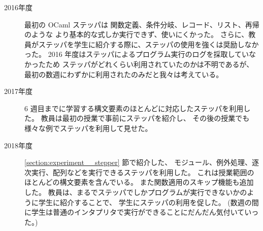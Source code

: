\begin{description}
\item[2016年度] 最初の OCaml ステッパは
関数定義、条件分岐、レコード、リスト、再帰のような
より基本的な式しか実行できず、使いにくかった。
さらに、教員がステッパを学生に紹介する際に、ステッパの使用を強くは奨励しなかった。
2016 年度はステッパによるプログラム実行のログを採取していなかったため
ステッパがどれくらい利用されていたのかは不明であるが、
最初の数週にわずかに利用されたのみだと我々は考えている。
\item[2017年度] 6 週目までに学習する構文要素のほとんどに対応したステッパを利用した。
教員は最初の授業で事前にステッパを紹介し、
その後の授業でも様々な例でステッパを利用して見せた。
\item[2018年度] \ref{section:experiment__stepper} 節で紹介した、
モジュール、例外処理、逐次実行、配列などを実行できるステッパを利用した。
これは授業範囲のほとんどの構文要素を含んでいる。
また関数適用のスキップ機能も追加した。
教員は、まるでステッパでしかプログラムが実行できないかのように学生に紹介することで、
学生にステッパの利用を促した。
(数週の間に学生は普通のインタプリタで実行ができることにだんだん気付いていった。)
\end{description}

